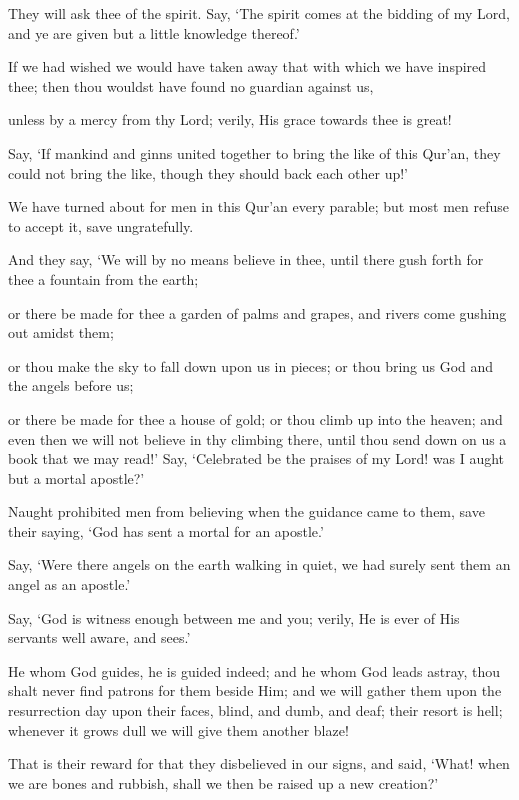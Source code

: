 \documentclass[fontsize=14pt, letterpaper, notitlepage, openany, DIV=12]{scrbook} %
\begin{document}
\noindent[17:85]
They will ask thee of the spirit. Say, `The spirit comes at the bidding of my Lord, and ye
are given but a little knowledge thereof.'

\noindent[17:86]
If we had wished we would have taken away that with which we have inspired thee; then
thou wouldst have found no guardian against us,

\noindent[17:87]
unless by a mercy from thy Lord; verily, His grace towards thee is great!

\noindent[17:88]
Say, `If mankind and ginns united together to bring the like of this Qur'an, they could not
bring the like, though they should back each other up!'

\noindent[17:89]
We have turned about for men in this Qur'an every parable; but most men refuse to
accept it, save ungratefully.

\noindent[17:90]
And they say, `We will by no means believe in thee, until there gush forth for thee a
fountain from the earth;

\noindent[17:91]
or there be made for thee a garden of palms and grapes, and rivers come gushing out
amidst them;

\noindent[17:92]
or thou make the sky to fall down upon us in pieces; or thou bring us God and the angels
before us;

\noindent[17:93]
or there be made for thee a house of gold; or thou climb up into the heaven; and even
then we will not believe in thy climbing there, until thou send down on us a book that we may
read!' Say, `Celebrated be the praises of my Lord! was I aught but a mortal apostle?'

\noindent[17:94]
Naught prohibited men from believing when the guidance came to them, save their
saying, `God has sent a mortal for an apostle.'

\noindent[17:95]
Say, `Were there angels on the earth walking in quiet, we had surely sent them an angel
as an apostle.'

\noindent[17:96]
Say, `God is witness enough between me and you; verily, He is ever of His servants well
aware, and sees.'

\noindent[17:97]
He whom God guides, he is guided indeed; and he whom God leads astray, thou shalt
never find patrons for them beside Him; and we will gather them upon the resurrection day upon
their faces, blind, and dumb, and deaf; their resort is hell; whenever it grows dull we will give
them another blaze!

\noindent[17:98]
That is their reward for that they disbelieved in our signs, and said, `What! when we are
bones and rubbish, shall we then be raised up a new creation?'
\end{document}

